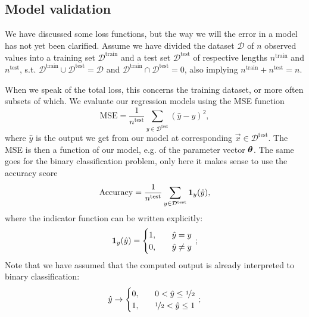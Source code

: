 \subsection{Model validation} %

We have discussed some loss functions, but the way we will  the error in a model has not yet been clarified. Assume we have divided the dataset $\mathcal{D}$ of $n$ observed values into a training set $\mathcal{D}^\mathrm{train}$ and a test set $\mathcal{D}^\mathrm{test}$ of respective lengths $n^\mathrm{train}$ and $n^\mathrm{test}$, s.t. $ \mathcal{D}^\mathrm{train} \cup\mathcal{D}^\mathrm{test} = \mathcal{D}$ and $\mathcal{D}^\mathrm{train} \cap\mathcal{D}^\mathrm{test} = 0 $, also implying $n^\mathrm{train}+n^\mathrm{test}=n$.

When we speak of the total loss, this concerns the training dataset, or more often subsets of which. We evaluate our regression models using the MSE function
\begin{equation}\label{eq:MSE}
    \mathrm{MSE} = \frac{1}{n^\mathrm{test}} \sum_{y\in \mathcal{D}^\mathrm{test}} (\hat{y} - y)^2,
\end{equation}
where $\hat{y}$ is the output we get from our model at corresponding $\vec{x}\in\mathcal{D}^\mathrm{test}$. The MSE is then a function of our model, e.g. of the parameter vector $\boldsymbol{\theta}$. The same goes for the binary classification problem, only here it makes sense to use the accuracy score
\begin{equation}\label{eq:accuracy}
    \mathrm{Accuracy} = \frac{1}{n^\mathrm{test}} \sum_{y\in \mathcal{D}^\mathrm{test}} \boldsymbol{1}_{y}(\hat{y}),
\end{equation}
where the indicator function can be written explicitly:
\begin{equation}\label{eq:indicator}
    \boldsymbol{1}_y(\hat{y}) = \begin{cases}
        1, \quad & \hat{y} = y \\
        0, \quad & \hat{y} \neq y
    \end{cases}\, ;
\end{equation}
Note that we have assumed that the computed output is already interpreted to binary classification:
\begin{equation}\label{eq:binary_y}
    \hat{y} \to \begin{cases}
        0, \quad & 0 <\hat{y} \leq \nicefrac{1}{2} \\
        1, \quad & \nicefrac{1}{2} < \hat{y} \leq 1
    \end{cases}\, ;
\end{equation}
